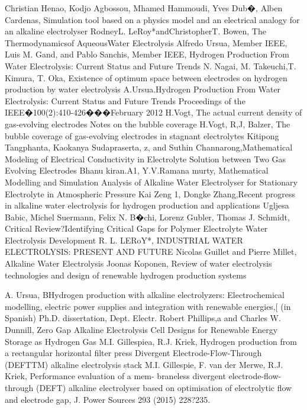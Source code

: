 \begin{thebibliography}{99}
Christian Henao, Kodjo Agbossou, Mhamed Hammoudi, Yves Dub�, Alben Cardenas, Simulation tool based on a physics model and an electrical analogy for an alkaline electrolyser
RodneyL. LeRoy*andChristopherT. Bowen, The Thermodynamicsof AqueousWater Electrolysis
Alfredo Ursua, Member IEEE, Luis M. Gand, and Pablo Sanchis, Member IEEE, Hydrogen Production From
Water Electrolysis: Current Status and Future Trends
N. Nagai, M. Takeuchi,T. Kimura, T. Oka, Existence of optimum space between electrodes on hydrogen production by water electrolysis
A.Ursua.Hydrogen Production From Water Electrolysis: Current Status and Future Trends Proceedings of the IEEE�100(2):410-426���February 2012
H.Vogt, The actual current density of gas-evolving electrodes Notes on the bubble coverage
H.Vogt, R,J, Balzer, The bubble coverage of gas-evolving electrodes in stagnant electrolytes
Kitipong Tangphanta, Kaokanya Sudapraserta, z, and Suthin Channarong,Mathematical Modeling of Electrical Conductivity
in Electrolyte Solution between Two Gas Evolving Electrodes
Bhanu kiran.A1, Y.V.Ramana murty, Mathematical Modelling and Simulation Analysis of Alkaline Water Electrolyser for Stationary Electrolyte in Atmospheric Pressure
Kai Zeng 1, Dongke Zhang,Recent progress in alkaline water electrolysis for hydrogen production and applications
Ugljesa Babic, Michel Suermann, Felix N. B�chi, Lorenz Gubler, Thomas J. Schmidt, Critical Review?Identifying Critical Gaps for Polymer Electrolyte Water Electrolysis Development
R. L. LERoY*, INDUSTRIAL WATER ELECTROLYSIS: PRESENT AND FUTURE
Nicolas Guillet and Pierre Millet, Alkaline Water Electrolysis
Joonas Koponen, Review of water electrolysis technologies and design of renewable hydrogen production systems

A. Ursua, BHydrogen production with alkaline electrolyzers: Electrochemical modelling, electric power supplies
and integration with renewable energies,[ (in Spanish) Ph.D. dissertation, Dept. Electr.
Robert Phillips,a and Charles W. Dunnill,  Zero Gap Alkaline Electrolysis Cell Designs for
 Renewable Energy Storage as Hydrogen Gas
M.I. Gillespiea, R.J. Kriek, Hydrogen production from a rectangular horizontal filter press Divergent Electrode-Flow-Through (DEFTTM) alkaline electrolysis stack
M.I. Gillespie, F. van der Merwe, R.J. Kriek, Performance evaluation of a mem-
braneless divergent electrode-flow-through (DEFT) alkaline electrolyser based on optimisation of electrolytic flow and electrode gap, J. Power Sources 293 (2015) 228?235.


\end{thebibliography}
